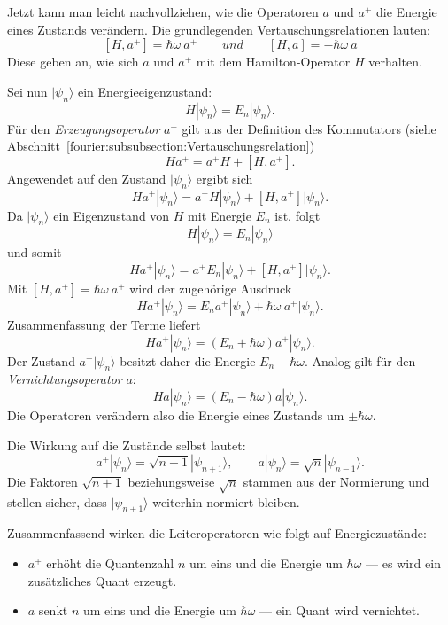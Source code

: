 Jetzt kann man leicht nachvollziehen, wie die Operatoren $a$ und $a^+$ die Energie eines Zustands verändern.
Die grundlegenden Vertauschungsrelationen lauten:
\[
	[H, a^+] = \hbar\omega~a^+
	\qquad
	und
	\qquad
	[H, a] = -\hbar\omega~a
\]
Diese geben an, wie sich $a$ und $a^+$ mit dem Hamilton-Operator $H$ verhalten.

Sei nun $|\psi_n\rangle$ ein Energieeigenzustand:
\[
	H|\psi_n\rangle = E_n|\psi_n\rangle.
\]
Für den \emph{Erzeugungsoperator} $a^+$ gilt aus der Definition des Kommutators (siehe Abschnitt~\ref{fourier:subsubsection:Vertauschungsrelation})
%
\[
	H a^+ = a^+ H + [H, a^+].
\]
Angewendet auf den Zustand $|\psi_n\rangle$ ergibt sich
\[
	H a^+|\psi_n\rangle = a^+ H|\psi_n\rangle + [H, a^+]|\psi_n\rangle.
\]
Da $|\psi_n\rangle$ ein Eigenzustand von $H$ mit Energie $E_n$ ist, folgt
\[
	H|\psi_n\rangle = E_n|\psi_n\rangle
\]
und somit
\[
	H a^+|\psi_n\rangle = a^+ E_n|\psi_n\rangle + [H, a^+]|\psi_n\rangle.
\]
Mit $[H, a^+] = \hbar\omega~a^+$ wird der zugehörige Ausdruck
\[
	H a^+|\psi_n\rangle = E_n a^+|\psi_n\rangle + \hbar\omega~a^+|\psi_n\rangle.
\]
Zusammenfassung der Terme liefert
\begin{equation}
	H a^+|\psi_n\rangle = (E_n + \hbar\omega)a^+|\psi_n\rangle.
\end{equation}
Der Zustand $a^+|\psi_n\rangle$ besitzt daher die Energie $E_n + \hbar\omega$.
Analog gilt für den \emph{Vernichtungsoperator} $a$:
\begin{equation}
	H a |\psi_n\rangle = (E_n - \hbar\omega)a|\psi_n\rangle.
\end{equation}
Die Operatoren verändern also die Energie eines Zustands um $\pm\hbar\omega$.

Die Wirkung auf die Zustände selbst lautet:
\begin{equation}
	a^+|\psi_n\rangle = \sqrt{n+1}|\psi_{n+1}\rangle, \qquad a|\psi_n\rangle = \sqrt{n}|\psi_{n-1}\rangle.
\end{equation}
Die Faktoren $\sqrt{n+1}$ beziehungsweise $\sqrt{n}$ stammen aus der Normierung und stellen sicher, dass $|\psi_{n\pm 1}\rangle$ weiterhin normiert bleiben.

Zusammenfassend wirken die Leiteroperatoren wie folgt auf Energiezustände:
\begin{itemize}
	\item $a^+$ erhöht die Quantenzahl $n$ um eins und die Energie um $\hbar\omega$ ---
	es wird ein zusätzliches Quant erzeugt.
	\item $a$ senkt $n$ um eins und die Energie um $\hbar\omega$ ---
	ein Quant wird vernichtet.
\end{itemize}

